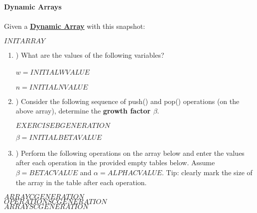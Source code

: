 \textbf{\LARGE{\color{tumgadRed}Dynamic Arrays}}\\
\\
\noindent
Given a \href{https://sebastianoner.github.io/TUMGAD/src/DataStructures/Sequences/Arrays/Arrays}{\textbf{\underline{Dynamic Array}}} with this snapshot:
\begin{center}
    $INITARRAY$
\end{center}
\begin{enumerate}[label=\alph*]
    \item \hspace{-5px}) What are the values of the following variables?\\
    \\
    \color{tumgadRed}
    $w = INITIALWVALUE$\\
    \\
    $n = INITIALNVALUE$
    \\
    \color{black}
    \item \hspace{-5px}) Consider the following sequence of push() and pop() operations (on the above array), determine the \textbf{growth factor $\beta$}.
    \begin{center}
        $EXERCISEBGENERATION$
    \end{center}
    \color{tumgadRed}
    $\beta = INITIALBETAVALUE$\\
    \color{black}
    \item \hspace{-5px}) Perform the following operations on the array below and enter the values after each operation in the provided empty
    tables below. Assume $\beta = BETACVALUE$ and $\alpha = ALPHACVALUE$. Tip: clearly mark the size of the array in the table after each operation.
\end{enumerate}
\begin{center}
    $ARRAYCGENERATION$\\
    \color{tumgadRed}
    $OPERATIONSCGENERATION$\\
    $ARRAYSCGENERATION$
    \color{black}
\end{center}
